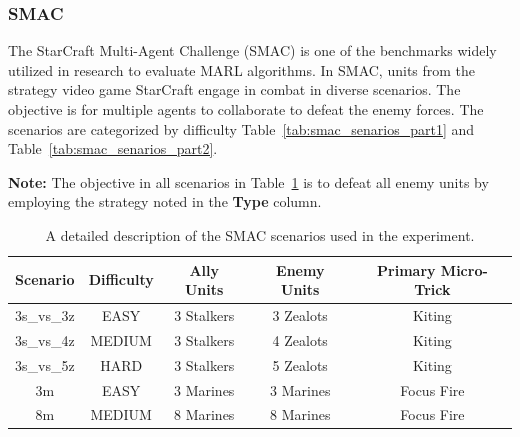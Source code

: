 \subsubsection{SMAC}

The StarCraft Multi-Agent Challenge (SMAC) \parencite{smac} is one of the benchmarks widely utilized in research to evaluate MARL algorithms. In SMAC, units from the strategy video game StarCraft engage in combat in diverse scenarios. The objective is for multiple agents to collaborate to defeat the enemy forces. The scenarios are categorized by difficulty  Table~\ref{tab:smac_senarios_part1} and Table~\ref{tab:smac_senarios_part2}.

\noindent\textbf{Note:} The objective in all scenarios in Table~\ref{tab:smac_scenarios_used} is to defeat all enemy units by employing the strategy noted in the \textbf{Type} column.

\begin{table}[H]
\centering

\renewcommand{\arraystretch}{1.6} 

\begin{tabular}{ccccc}
\hline
\textbf{Scenario} & \textbf{Difficulty} & \textbf{Ally Units} & \textbf{Enemy Units} & \textbf{Primary Micro-Trick} \\
\hline
3s\_vs\_3z & EASY & 3 Stalkers & 3 Zealots & Kiting \\
\hline
3s\_vs\_4z & MEDIUM & 3 Stalkers & 4 Zealots & Kiting \\
\hline
3s\_vs\_5z & HARD & 3 Stalkers & 5 Zealots & Kiting \\
\hline
3m & EASY & 3 Marines & 3 Marines & Focus Fire \\
\hline
8m & MEDIUM & 8 Marines & 8 Marines & Focus Fire \\
\hline
\end{tabular}
\caption{A detailed description of the SMAC scenarios used in the experiment.}
\label{tab:smac_scenarios_used}
\end{table}



